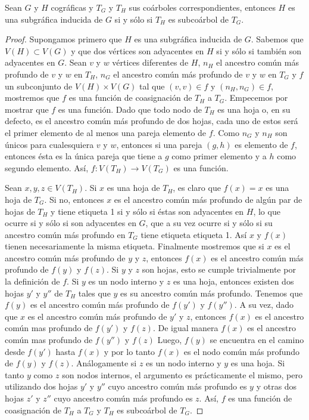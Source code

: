 \begin{lemma}\label{lema_subcoa_01}
    Sean $G$ y $H$ cográficas y $T_G$ y $T_H$ sus coárboles correspondientes, entonces $H$ es una subgráfica inducida de $G$ si y sólo si $T_H$ es subcoárbol de $T_G$.
\end{lemma}

\begin{proof}
    
    Supongamos primero que $H$ es una subgráfica inducida de $G$. Sabemos que
    $V(H)\subset V(G)$ y que dos vértices son adyacentes en $H$ si y sólo si
    también son adyacentes en $G$. Sean $v$ y $w$ vértices diferentes de $H$,
    $n_H$ el ancestro común más profundo de $v$ y $w$ en $T_H$, $n_G$ el
    ancestro común más profundo de $v$ y $w$ en $T_G$ y $f$ un subconjunto de
    $V(H)\times V(G)$ tal que $(v,v)\in f$ y $(n_H, n_G)\in f$, mostremos que
    $f$ es una función de coasignación de $T_H$ a $T_G$. Empecemos por mostrar
    que $f$ es una función. Dado que todo nodo de $T_H$ es una hoja o, en su
	defecto, es el ancestro común más profundo de dos hojas, cada uno de estos
	será el primer elemento de al menos una pareja elemento de $f$. Como $n_G$
	y $n_H$ son únicos para cualesquiera $v$ y $w$, entonces si una pareja 
	$(g,h)$ es elemento de $f$, entonces ésta es la única pareja que tiene a 
	$g$ como primer elemento y a $h$ como segundo elemento. Así, 
	$f:V(T_H)\rightarrow V(T_G)$ es una función. 
    
    Sean $x,y,z\in V(T_H)$. Si $x$ es una
    hoja de $T_H$, es claro que $f(x) = x$ es una hoja de $T_G$. Si no,
    entonces $x$ es el ancestro común más profundo de algún par de hojas de
    $T_H$ y tiene etiqueta 1 si y sólo si éstas son adyacentes en $H$, lo que
    ocurre si y sólo si son adyacentes en $G$, que a su vez ocurre si y sólo si
    su ancestro común más profundo en $T_G$ tiene etiqueta etiqueta 1. Así $x$
    y $f(x)$ tienen necesariamente la misma etiqueta. Finalmente mostremos que
    si $x$ es el ancestro común más profundo de $y$ y $z$, entonces $f(x)$ es
    el ancestro común más profundo de $f(y)$ y $f(z)$. Si $y$ y $z$ son hojas,
    esto se cumple trivialmente por la definición de $f$. Si $y$ es un nodo
    interno y $z$ es una hoja, entonces existen dos hojas $y'$ y $y''$ de $T_H$
    tales que $y$ es su ancestro común más profundo. Tenemos que $f(y)$ es el
    ancestro común más profundo de $f(y')$ y $f(y'')$. A su vez, dado que $x$
    es el ancestro común más profundo de $y'$ y $z$, entonces $f(x)$ es el
    ancestro común mas profundo de $f(y')$ y $f(z)$. De igual manera $f(x)$ es
    el ancestro común mas profundo de $f(y'')$ y $f(z)$ Luego, $f(y)$ se
    encuentra en el camino desde $f(y')$ hasta $f(x)$ y por lo tanto $f(x)$ es
    el nodo común más profundo de $f(y)$ y $f(z)$. Análogamente si $z$ es un
    nodo interno y $y$ es una hoja. Si tanto $y$ como $z$ son nodos internos,
    el argumento es prácticamente el mismo, pero utilizando dos hojas $y'$ y
    $y''$ cuyo ancestro común más profundo es $y$ y otras dos hojas $z'$ y
    $z''$ cuyo ancestro común más profundo es $z$. Así, $f$ es una función de
    coasignación de $T_H$ a $T_G$ y $T_H$ es subcoárbol de $T_G$.


\end{proof}
